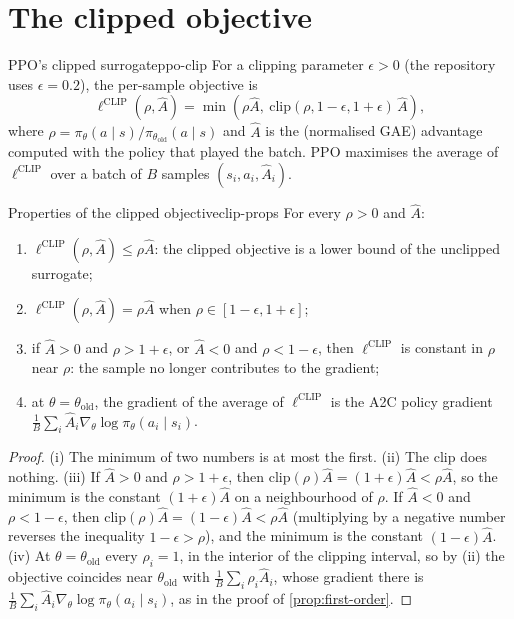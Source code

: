 \section{The clipped objective}

\begin{definition}{PPO's clipped surrogate}{ppo-clip}
  For a clipping parameter $\epsilon > 0$ (the repository uses $\epsilon =
  0.2$), the per-sample objective is
  \begin{equation}
    \label{eq:ppo-clip}
    \ell^{\mathrm{CLIP}}(\rho, \hat A) = \min\left( \rho \hat A,\
    \mathrm{clip}(\rho, 1 - \epsilon, 1 + \epsilon)\, \hat A \right),
  \end{equation}
  where $\rho = \pi_\theta(a \mid s) / \pi_{\theta_{\mathrm{old}}}(a \mid
  s)$ and $\hat A$ is the (normalised GAE) advantage computed with the
  policy that played the batch. PPO maximises the average of
  $\ell^{\mathrm{CLIP}}$ over a batch of $B$ samples $(s_i, a_i, \hat A_i)$.
\end{definition}

\begin{proposition}{Properties of the clipped objective}{clip-props}
  For every $\rho > 0$ and $\hat A$:
  \begin{enumerate}[nosep, label=(\roman*)]
    \item $\ell^{\mathrm{CLIP}}(\rho, \hat A) \leq \rho \hat A$: the clipped
      objective is a lower bound of the unclipped surrogate;
    \item $\ell^{\mathrm{CLIP}}(\rho, \hat A) = \rho \hat A$ when $\rho \in
      [1 - \epsilon, 1 + \epsilon]$;
    \item if $\hat A > 0$ and $\rho > 1 + \epsilon$, or $\hat A < 0$ and
      $\rho < 1 - \epsilon$, then $\ell^{\mathrm{CLIP}}$ is constant in
      $\rho$ near $\rho$: the sample no longer contributes to the gradient;
    \item at $\theta = \theta_{\mathrm{old}}$, the gradient of the average
      of $\ell^{\mathrm{CLIP}}$ is the A2C policy gradient $\frac{1}{B}
      \sum_i \hat A_i \nabla_\theta \log \pi_\theta(a_i \mid s_i)$.
  \end{enumerate}
\end{proposition}

\begin{proof}
  (i) The minimum of two numbers is at most the first. (ii) The clip does
  nothing. (iii) If $\hat A > 0$ and $\rho > 1 + \epsilon$, then
  $\mathrm{clip}(\rho) \hat A = (1 + \epsilon) \hat A < \rho \hat A$, so
  the minimum is the constant $(1 + \epsilon) \hat A$ on a neighbourhood of
  $\rho$. If $\hat A < 0$ and $\rho < 1 - \epsilon$, then $\mathrm{clip}
  (\rho) \hat A = (1 - \epsilon) \hat A < \rho \hat A$ (multiplying by a
  negative number reverses the inequality $1 - \epsilon > \rho$), and the
  minimum is the constant $(1 - \epsilon)\hat A$. (iv) At $\theta =
  \theta_{\mathrm{old}}$ every $\rho_i = 1$, in the interior of the
  clipping interval, so by (ii) the objective coincides near $\theta_{\mathrm
  {old}}$ with $\frac{1}{B} \sum_i \rho_i \hat A_i$, whose gradient there
  is $\frac{1}{B} \sum_i \hat A_i \nabla_\theta \log \pi_\theta(a_i \mid
  s_i)$, as in the proof of \cref{prop:first-order}.
\end{proof}

